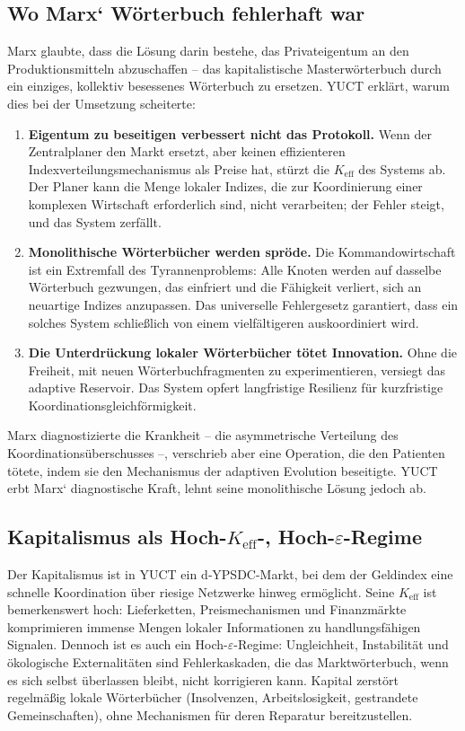 \documentclass[12pt,a4paper]{article}
\newcommand{\Keff}{K_{\mathrm{eff}}}
\begin{document}
\subsection{Wo Marx‘ Wörterbuch fehlerhaft war}

Marx glaubte, dass die Lösung darin bestehe, das Privateigentum an den Produktionsmitteln abzuschaffen – das kapitalistische Masterwörterbuch durch ein einziges, kollektiv besessenes Wörterbuch zu ersetzen. YUCT erklärt, warum dies bei der Umsetzung scheiterte:

\begin{enumerate}[leftmargin=*]
	\item \textbf{Eigentum zu beseitigen verbessert nicht das Protokoll.} Wenn der Zentralplaner den Markt ersetzt, aber keinen effizienteren Indexverteilungsmechanismus als Preise hat, stürzt die \(\Keff\) des Systems ab. Der Planer kann die Menge lokaler Indizes, die zur Koordinierung einer komplexen Wirtschaft erforderlich sind, nicht verarbeiten; der Fehler steigt, und das System zerfällt.
	\item \textbf{Monolithische Wörterbücher werden spröde.} Die Kommandowirtschaft ist ein Extremfall des Tyrannenproblems: Alle Knoten werden auf dasselbe Wörterbuch gezwungen, das einfriert und die Fähigkeit verliert, sich an neuartige Indizes anzupassen. Das universelle Fehlergesetz garantiert, dass ein solches System schließlich von einem vielfältigeren auskoordiniert wird.
	\item \textbf{Die Unterdrückung lokaler Wörterbücher tötet Innovation.} Ohne die Freiheit, mit neuen Wörterbuchfragmenten zu experimentieren, versiegt das adaptive Reservoir. Das System opfert langfristige Resilienz für kurzfristige Koordinationsgleichförmigkeit.
\end{enumerate}

Marx diagnostizierte die Krankheit – die asymmetrische Verteilung des Koordinationsüberschusses –, verschrieb aber eine Operation, die den Patienten tötete, indem sie den Mechanismus der adaptiven Evolution beseitigte. YUCT erbt Marx‘ diagnostische Kraft, lehnt seine monolithische Lösung jedoch ab.

\subsection{Kapitalismus als Hoch-\(\Keff\)-, Hoch-\(\varepsilon\)-Regime}

Der Kapitalismus ist in YUCT ein d‑YPSDC-Markt, bei dem der Geldindex eine schnelle Koordination über riesige Netzwerke hinweg ermöglicht. Seine \(\Keff\) ist bemerkenswert hoch: Lieferketten, Preismechanismen und Finanzmärkte komprimieren immense Mengen lokaler Informationen zu handlungsfähigen Signalen. Dennoch ist es auch ein Hoch-\(\varepsilon\)-Regime: Ungleichheit, Instabilität und ökologische Externalitäten sind Fehlerkaskaden, die das Marktwörterbuch, wenn es sich selbst überlassen bleibt, nicht korrigieren kann. Kapital zerstört regelmäßig lokale Wörterbücher (Insolvenzen, Arbeitslosigkeit, gestrandete Gemeinschaften), ohne Mechanismen für deren Reparatur bereitzustellen.
\end{document}
